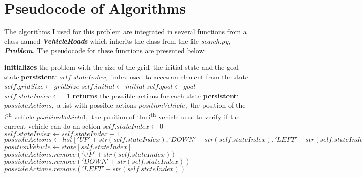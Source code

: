 \documentclass[14pt]{article}
\begin{document}
\section{Pseudocode of Algorithms}
The algorithms I used for this problem are integrated in several functions from a class named \textit{\textbf{VehicleRoads}} which inherits the class from the file \textit{search.py}, \textit{\textbf{Problem}}. The pseudocode for these functions are presented below:
\vspace{2.5 mm}
\begin{algorithmic}
 \textbf{initializes} the problem with the size of the grid, the initial state and the goal state
    \State \textbf{persistent: }$self.stateIndex,$ index used to acces an element from the state
    \State $self.gridSize \gets gridSize$
    \State $self.initial \gets initial$
    \State $self.goal \gets goal$
    \State $self.stateIndex \gets -1$
    \State {}
\EndFunction
\vspace{2.5 mm}
 \textbf{returns} the possible actions for each state
    \State \textbf{persistent:} $possibleActions,$ a list with possible actions
    \State $positionVehicle,$ the position of the i\textsuperscript{th} vehicle
    \State $positionVehicle1,$ the position of the i\textsuperscript{th} vehicle used to verify if the current vehicle can do an action
        \State $self.stateIndex \gets 0$
    \Else
        \State $self.stateIndex \gets self.stateIndex + 1$
    \EndIf
    \State $possibleActions \gets list['UP' + str(self.stateIndex), 'DOWN' + str(self.stateIndex), 'LEFT' + str(self.stateIndex), 'RIGHT' + str(self.stateIndex), 'PUT' + str(self.stateIndex)]$
    \State $positionVehicle \gets state[self.stateIndex]$
            \State $possibleActions.remove('UP' + str(self.stateIndex))$
        \EndIf
    \EndIf
            \State $possibleActions.remove('DOWN' + str(self.stateIndex))$
        \EndIf
    \EndIf
            \State $possibleActions.remove('LEFT' + str(self.stateIndex))$
        \EndIf
    \EndIf

\end{algorithmic}
\end{document}
